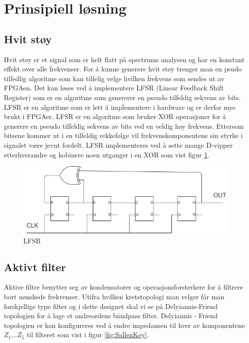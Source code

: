 \newpage
\section{Prinsipiell løsning}
\label{prinsipiellLoesning}

\subsection{Hvit støy}
\label{hvitStoeoy}
Hvit støy er et signal som er helt flatt på spectrums analysen og har en konstant effekt over alle frekvenser. For å kunne generere hvit støy trenger man en psudo tilfedlig algoritme som kan tilfelig velge hvilken frekvens som sendes ut av FPGAen. Det kan løses ved å implementere LFSR (Linear Feedback Shift Register) som er en algoritme som genererer en pseudo tilfeldig sekvens av bits. LFSR er en algoritme som er lett å implementere i hardware og er derfor mye brukt i FPGAer. LFSR er en algoritme som bruker XOR operasjoner for å generere en pseudo tilfeldig sekvens av bits ved en veldig høy frekvens. Ettersom bitsene kommer ut i en tilfeldig rekkefølge vil frekvenskomponentene sin styrke i signalet være jevnt fordelt. LFSR implementeres ved å sette mange D-vipper etterhverandre og kobinere noen utganger i en XOR som vist figur \ref{fig:LFSR}.

\begin{figure} [!h]
\centering
\includegraphics[width=1\linewidth]{Bilder/LFSR.drawio.png}
\caption{LFSR}
\label{fig:LFSR}
\end{figure}

\subsection{Aktivt filter}
\label{aktivtFilter}

Aktive filtre benytter seg av kondensatorer og operasjonsforsterkere for å filtrere bort uønskede frekvenser. Utifra hvilken kretstopologi man velger får man forskjellige type filter og i dette designet skal vi se på Delyiannis-Friend topologien for å lage et andreordens båndpass filter. Delyiannis - Friend topologien er kan konfigureres ved å endre impedansen til hver av komponentene $Z_1 ... Z_5$ til filteret som vist i figur \ref{fig:SallenKey}.

